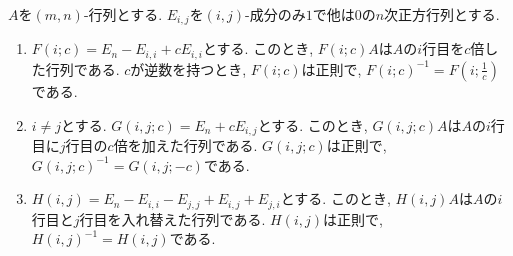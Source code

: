 \begin{lemma}
  \label{lem:fundamental}
  $A$を$(m,n)$-行列とする.
  $E_{i,j}$を$(i,j)$-成分のみ$1$で他は$0$の$n$次正方行列とする.
  \begin{enumerate}
  \item\label{lem:fundamental:item:sc}
    $F(i;c)=E_n-E_{i,i}+cE_{i,i}$とする.
    このとき, $F(i;c)A$は$A$の$i$行目を$c$倍した行列である.
    $c$が逆数を持つとき, $F(i;c)$は正則で, $F(i;c)^{-1}=F(i;\frac{1}{c})$である.
  \item\label{lem:fundamental:item:sum}
    $i\neq j$とする. $G(i,j;c)=E_n+cE_{i,j}$とする.
    このとき, $G(i,j;c)A$は$A$の$i$行目に$j$行目の$c$倍を加えた行列である.
    $G(i,j;c)$は正則で, $G(i,j;c)^{-1}=G(i,j;-c)$である.
  \item\label{lem:fundamental:item:trans}
    $H(i,j)=E_n-E_{i,i}-E_{j,j}+E_{i,j}+E_{j,i}$とする.
    このとき, $H(i,j)A$は$A$の$i$行目と$j$行目を入れ替えた行列である.
    $H(i,j)$は正則で, $H(i,j)^{-1}=H(i,j)$である.
  \end{enumerate}
\end{lemma}
